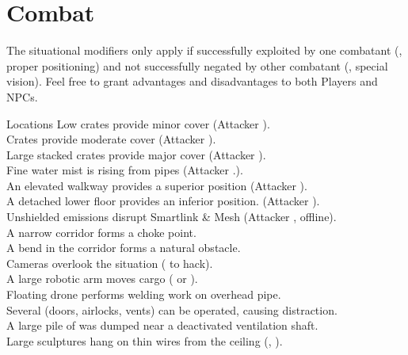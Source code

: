 \documentclass[a4]{book}
\begin{document}
\section*{Combat}

The situational modifiers only apply if successfully exploited by
one combatant (\eg, proper positioning) and not successfully negated
by other combatant (\eg, special vision).
%
Feel free to grant advantages and disadvantages to both Players and NPCs.

\begin{tableone}{Locations}
Low crates provide minor cover (Attacker ).\\
Crates provide moderate cover (Attacker ).\\
Large stacked crates provide major cover (Attacker ).\\
Fine water mist is rising from pipes (Attacker .).\\
An elevated walkway provides a superior position (Attacker ).\\
A detached lower floor provides an inferior position. (Attacker ).\\
Unshielded emissions disrupt Smartlink \& Mesh (Attacker , offline).\\
A narrow corridor forms a choke point.\\
A bend in the corridor forms a natural obstacle.\\

Cameras overlook the situation ( to hack).\\
A large robotic arm moves cargo ( or ).\\
Floating drone performs welding work on overhead pipe.\\
Several (doors, airlocks, vents) can be operated, causing distraction.\\
A large pile of  was dumped near a deactivated ventilation shaft.\\

Large sculptures hang on thin wires from the ceiling (, ).\\

\end{tableone}
\end{document}
